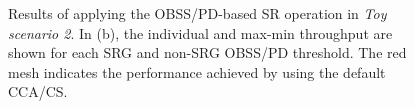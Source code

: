 \documentclass{ieeeaccess}
\begin{document}
\begin{figure}[ht!]
	\centering
	\hspace{1cm}
	\caption{Results of applying the OBSS/PD-based SR operation in \emph{Toy scenario 2}. In (b), the individual and max-min throughput are shown for each SRG and non-SRG OBSS/PD threshold. The red mesh indicates the performance achieved by using the default CCA/CS.}
	\label{fig:fig:17}
\end{figure}
\end{document}
